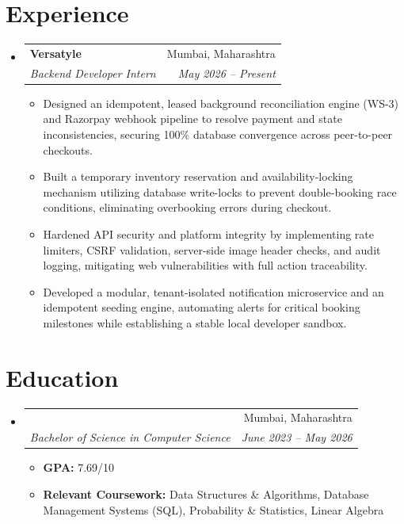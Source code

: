 \documentclass[letterpaper,11pt]{article}
\makeatletter
\newcommand{\resumeItem}[1]{
  \item\small{
    {#1 \vspace{-2pt}}
  }
}
\newcommand{\resumeSubheading}[4]{
  \vspace{-2pt}\item
    \begin{tabular*}{0.97\textwidth}[t]{l@{\extracolsep{\fill}}r}
      \textbf{#1} & #2 \\
      \textit{\small#3} & \textit{\small #4} \\
    \end{tabular*}\vspace{-7pt}
}
\newcommand{\resumeSubHeadingListStart}{\begin{itemize}[leftmargin=0.15in, label={}]}
\newcommand{\resumeSubHeadingListEnd}{\end{itemize}}
\newcommand{\resumeItemListStart}{\begin{itemize}}
\newcommand{\resumeItemListEnd}{\end{itemize}\vspace{-5pt}}
\makeatother
\begin{document}
\section{Experience}
  \resumeSubHeadingListStart
    \resumeSubheading
      {Versatyle}{Mumbai, Maharashtra}
      {Backend Developer Intern}{May 2026 -- Present}
      \resumeItemListStart
        \resumeItem{Designed an idempotent, leased background reconciliation engine (WS-3) and Razorpay webhook pipeline to resolve payment and state inconsistencies, securing 100\% database convergence across peer-to-peer checkouts.}
        \resumeItem{Built a temporary inventory reservation and availability-locking mechanism utilizing database write-locks to prevent double-booking race conditions, eliminating overbooking errors during checkout.}
        \resumeItem{Hardened API security and platform integrity by implementing rate limiters, CSRF validation, server-side image header checks, and audit logging, mitigating web vulnerabilities with full action traceability.}
        \resumeItem{Developed a modular, tenant-isolated notification microservice and an idempotent seeding engine, automating alerts for critical booking milestones while establishing a stable local developer sandbox.}
      \resumeItemListEnd
  \resumeSubHeadingListEnd

\section{Education}
  \resumeSubHeadingListStart
    \resumeSubheading
      {\parbox{0.7\textwidth}{Vivekanand Education Society's\\ College of Arts, Science and Commerce, Chembur}}{Mumbai, Maharashtra}
      {Bachelor of Science in Computer Science}{June 2023 -- May 2026}
      \resumeItemListStart
        \resumeItem{\textbf{GPA:} 7.69/10}
        \resumeItem{\textbf{Relevant Coursework:} Data Structures \& Algorithms, Database Management Systems (SQL), Probability \& Statistics, Linear Algebra}
      \resumeItemListEnd
  \resumeSubHeadingListEnd
\end{document}
